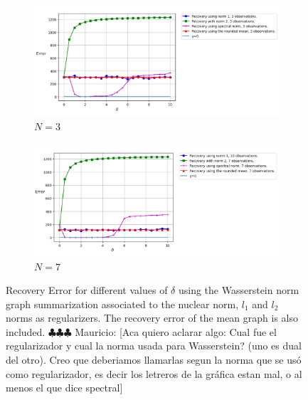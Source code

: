 \documentclass[12pt]{amsart}
\theoremstyle{remark}
\newcommand{\mv}[1]{{\color{red} \sf $\clubsuit\clubsuit\clubsuit$ Mauricio: [#1]}}
\begin{document}
\begin{figure}[H]
     \centering
     \begin{subfigure}[b]{1\textwidth}
         \centering
         \includegraphics[width=\textwidth]{./Pictures/differentNorms.PNG}
\caption{$N=3$}
     \end{subfigure}
     \hfill
     \begin{subfigure}[b]{1\textwidth}
         \centering
         \includegraphics[width=\textwidth]{./Pictures/differentNorms7.PNG}
         \caption{$N=7$}
     \end{subfigure}
\caption{Recovery Error for different values of $\delta$ using the Wasserstein norm graph summarization associated to the nuclear norm, $l_1$ and $l_2$ norms as regularizers. The recovery error of the mean graph is also included.
\mv{Aca quiero aclarar algo: Cual fue el regularizador y cual la norma usada para Wasserstein? (uno es dual del otro). Creo que deberiamos llamarlas segun la norma que se us\'o como regularizador, es decir los letreros de la gr\'afica estan mal, o al menos el que dice spectral}}
        \label{fig:differentNorms}
\end{figure}


  
\end{document}
